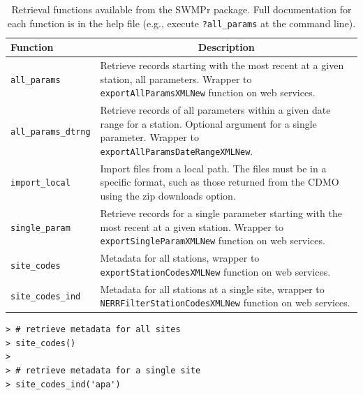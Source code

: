 \documentclass[10pt,letterpaper]{article}\usepackage[]{graphicx}\usepackage[]{color}
\makeatletter
\newenvironment{kframe}{%
 \def\at@end@of@kframe{}%
 \ifinner\ifhmode%
  \def\at@end@of@kframe{\end{minipage}}%
  \begin{minipage}{\columnwidth}%
 \fi\fi%
 \def\FrameCommand##1{\hskip\@totalleftmargin \hskip-\fboxsep
 \colorbox{shadecolor}{##1}\hskip-\fboxsep
     \hskip-\linewidth \hskip-\@totalleftmargin \hskip\columnwidth}%
 \MakeFramed {\advance\hsize-\width
   \@totalleftmargin\z@ \linewidth\hsize
   \@setminipage}}%
 {\par\unskip\endMakeFramed%
 \at@end@of@kframe}
\newenvironment{knitrout}{}{} %
\makeatother
\begin{document}
\begin{table}[!tbp]
\caption{Retrieval functions available from the SWMPr package. Full documentation for each function is in the help file (e.g., execute \texttt{?all\_params} at the command line).\label{tab:retrieve}} 
\begin{center}
\begin{tabular}{lp{3.5in}}
\hline\hline
\multicolumn{1}{l}{Function}&\multicolumn{1}{c}{Description}\tabularnewline
\hline
\texttt{all\_params}&Retrieve records starting with the most recent at a given station, all parameters.  Wrapper to \texttt{exportAllParamsXMLNew} function on web services.\tabularnewline
\texttt{all\_params\_dtrng}&Retrieve records of all parameters within a given date range for a station.  Optional argument for a single parameter. Wrapper to \texttt{exportAllParamsDateRangeXMLNew}.\tabularnewline
\texttt{import\_local}&Import files from a local path.  The files must be in a specific format, such as those returned from the \ac{CDMO} using the zip downloads option.\tabularnewline
\texttt{single\_param}&Retrieve records for a single parameter starting with the most recent at a given station.  Wrapper to \texttt{exportSingleParamXMLNew} function on web services.\tabularnewline
\texttt{site\_codes}&Metadata for all stations, wrapper to \texttt{exportStationCodesXMLNew} function on web services.\tabularnewline
\texttt{site\_codes\_ind}&Metadata for all stations at a single site, wrapper  to \texttt{NERRFilterStationCodesXMLNew} function on web services.\tabularnewline
\hline
\end{tabular}\end{center}

\end{table}


\begin{knitrout}\small
{}\color{fgcolor}\begin{kframe}
\begin{verbatim}
> # retrieve metadata for all sites
> site_codes()
> 
> # retrieve metadata for a single site
> site_codes_ind('apa')
\end{verbatim}
\end{kframe}
\end{knitrout}
\end{document}
